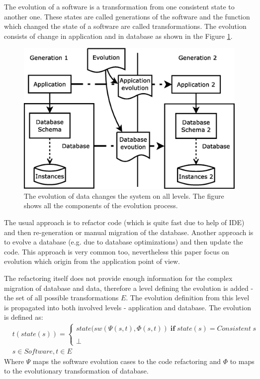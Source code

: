\documentclass[11pt]{article}
\begin{document}
The evolution of a software is a transformation from one consistent state to another one. These states are called generations of the software and the function which changed the state of a software are called transformations. The evolution consists of change in application and in database as shown in the Figure \ref{fig:evolution}. 
\begin{figure}
\centering
	\includegraphics[scale=0.4]{./images/evolution_simple}
	\caption{The evolution of data changes the system on all levels. The figure shows all the components of the evolution process.}
	\label{fig:evolution}
\end{figure}
The usual approach is to refactor code (which is quite fast due to help of IDE) and then re-generation or manual migration of the database. Another approach is to evolve a database (e.g. due to database optimizations) and then update the code. This approach is very common too, nevertheless this paper focus on evolution which origin from the application point of view. 

The refactoring itself does not provide enough information for the complex migration of database and data, therefore a level defining the evolution is added - the set of all possible transformations $E$. The evolution definition from this level is propagated into both involved levels - application and database. The evolution is defined as:
\begin{align*}
& t(state(s)) = \begin{cases}
state(sw(\Psi(s, t), \Phi(s,t)) \; \mathbf{if} \; state(s) = Consistent \; s\\\\
 	\perp
\end{cases}\\ 
& s \in Software, t \in E
\end{align*}
Where $\Psi$ maps the software evolution cases to the code refactoring and $\Phi$ to maps to the evolutionary transformation of database.
\end{document}
